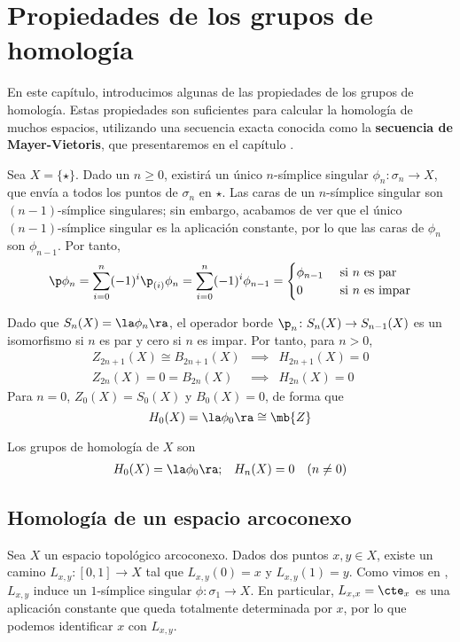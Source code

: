 \chapter{Propiedades de los grupos de homología}
En este capítulo, introducimos algunas de las propiedades de los grupos de
homología. Estas propiedades son suficientes para calcular la homología de muchos
espacios, utilizando una secuencia exacta conocida como la \textbf{secuencia de
Mayer-Vietoris}, que presentaremos en el capítulo .

Sea $X=\{\star\}$. Dado un $n \geq 0$, existirá un único $n$-símplice singular
$\phi_n\colon\sigma_n \to X$, que envía a todos los puntos de
$\sigma_n$ en $\star$. Las caras de un $n$-símplice singular son $(n-1)$-símplice
singulares; sin embargo, acabamos de ver que el único $(n-1)$-símplice singular
es la aplicación constante, por lo que las caras de $\phi_n$ son $\phi_{n-1}$.
Por tanto,
\begin{align*}
\p\phi_n=\sum^n_{i=0}(-1)^i\p_{(i)}\phi_{n}=\sum^n_{i=0}(-1)^i\phi_{n-1}=
\begin{cases}
\phi_{n-1}	&\mbox{ si }n\mbox{ es par}\\
0          	&\mbox{ si }n\mbox{ es impar}
\end{cases}
\end{align*}

Dado que $S_n(X)=\la \phi_n\ra$, el operador borde $\p_n\colon S_n(X)
\to S_{n-1}(X)$ es un isomorfismo si $n$ es par y cero si $n$ es impar. Por tanto, para $n > 0$,
\[\begin{array}{rcl}
Z_{2n+1}(X)\cong B_{2n+1}(X)&\implies& H_{2n+1}(X)=0\\[4pt]
Z_{2n}(X)=0=B_{2n}(X) &\implies& H_{2n}(X)=0
\end{array}\]
Para $n=0$, $Z_0(X)=S_0(X)$ y $B_0(X)=0$, de forma que
\[H_0(X)=\la \phi_0\ra \cong \mb{Z}\]

\begin{lemma}
Los grupos de homología de $X$ son
\begin{align*}
H_0(X)=\la\phi_0\ra; && H_n(X)=0 \quad (n\neq 0)
\end{align*}
\end{lemma}

\section{Homología de un espacio arcoconexo}
Sea $X$ un espacio topológico arcoconexo. Dados dos puntos $x,y \in X$, existe un
camino $L_{x,y}\colon [0,1] \to X$ tal que $L_{x,y}(0)=x$ y $L_{x,y}(1)=y$. Como
vimos en , $L_{x,y}$ induce un $1$-símplice singular
$\phi\colon \sigma_1 \to X$. En particular, $L_{x,x}=\cte_x$ es una aplicación
constante que queda totalmente determinada por $x$, por lo que podemos identificar
$x$ con $L_{x,y}$.

